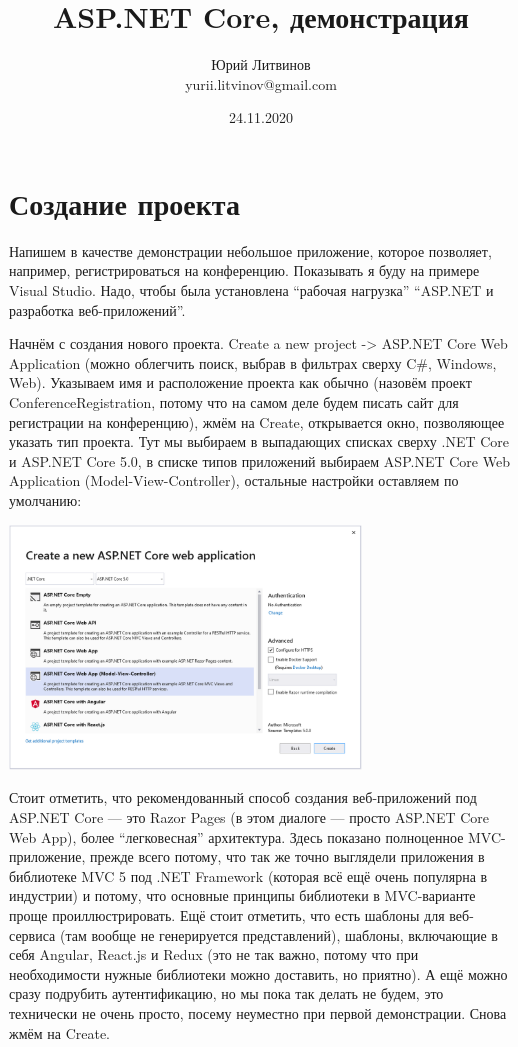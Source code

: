 \documentclass[a5paper]{article}
\title{ASP.NET Core, демонстрация}
\author{Юрий Литвинов\\\small{yurii.litvinov@gmail.com}}
\date{24.11.2020}
\begin{document}
\maketitle
\thispagestyle{empty}

\section{Создание проекта}

Напишем в качестве демонстрации небольшое приложение, которое позволяет, например, регистрироваться на конференцию. Показывать я буду на примере Visual Studio. Надо, чтобы была установлена ``рабочая нагрузка'' ``ASP.NET и разработка веб-приложений''.

Начнём с создания нового проекта. Create a new project -> ASP.NET Core Web Application (можно облегчить поиск, выбрав в фильтрах сверху C\#, Windows, Web).
Указываем имя и расположение проекта как обычно (назовём проект ConferenceRegistration, потому что на самом деле будем писать сайт для регистрации на конференцию), жмём на Create, открывается окно, позволяющее указать тип проекта. Тут мы выбираем в выпадающих списках сверху .NET Core и ASP.NET Core 5.0, в списке типов приложений выбираем ASP.NET Core Web Application (Model-View-Controller), остальные настройки оставляем по умолчанию:

\begin{center}
    \includegraphics[width=0.7\textwidth]{projectCreation.png}
\end{center}

Стоит отметить, что рекомендованный способ создания веб-приложений под ASP.NET Core --- это Razor Pages (в этом диалоге --- просто ASP.NET Core Web App), более ``легковесная'' архитектура. Здесь показано полноценное MVC-приложение,
прежде всего потому, что так же точно выглядели приложения в библиотеке MVC 5 под .NET Framework (которая всё ещё очень популярна в индустрии) и потому, что основные принципы библиотеки в MVC-варианте проще проиллюстрировать.
Ещё стоит отметить, что есть шаблоны для веб-сервиса (там вообще не генерируется представлений), шаблоны, включающие в себя Angular, React.js и Redux (это не так важно, потому что при необходимости нужные библиотеки можно доставить, но приятно). А ещё можно сразу подрубить аутентификацию, но мы пока так делать не будем, это технически не очень просто, посему неуместно при первой демонстрации. Снова жмём на Create.
\end{document}
